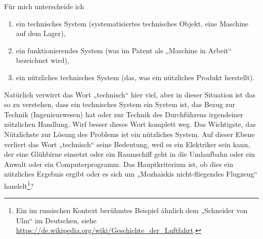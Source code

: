 \documentclass[11pt,a4paper]{article}
\begin{document}
Für mich unterscheide ich
\begin{enumerate}
\item ein technisches System (systematisiertes technisches Objekt, eine
  Maschine auf dem Lager),
\item ein funktionierendes System (was im Patent als „Maschine in Arbeit“
  bezeichnet wird),
\item ein nützliches technisches System (das, was ein nützliches Produkt
  herstellt).
\end{enumerate}

Natürlich verwirrt das Wort „technisch“ hier viel, aber in dieser Situation
ist das so zu verstehen, dass ein technisches System ein System ist, das Bezug
zur Technik (Ingenieurwesen) hat oder zur Technik des Durchführens irgendeiner
nützlichen Handlung. Wirf besser dieses Wort komplett weg. Das Wichtigste, das
Nützlichste zur Lösung des Problems ist ein nützliches System. Auf dieser
Ebene verliert das Wort „technisch“ seine Bedeutung, weil es ein Elektriker
sein kann, der eine Glühbirne einsetzt oder ein Raumschiff geht in die
Umlaufbahn oder ein Anwalt oder ein Computerprogramm. Das Hauptkriterium ist,
ob dies ein nützliches Ergebnis ergibt oder es sich um „Mozhaiskis
nicht-fliegendes Flugzeug“ handelt\footnote{Ein im russischen Kontext
  berühmtes Beispiel ähnlich dem „Schneider von Ulm“ im Deutschen, siehe
  \url{https://de.wikipedia.org/wiki/Geschichte_der_Luftfahrt}.}?
\end{document}

